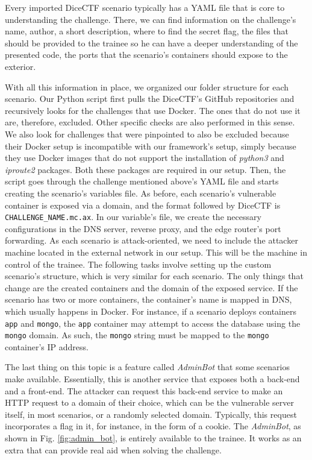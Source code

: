 Every imported DiceCTF scenario typically has a YAML file that is core to understanding the challenge. There, we can find information on the challenge's name, author, a short description, where to find the secret flag, the files that should be provided to the trainee so he can have a deeper understanding of the presented code, the ports that the scenario's containers should expose to the exterior.

With all this information in place, we organized our folder structure for each scenario. Our Python script first pulls the DiceCTF's GitHub repositories and recursively looks for the challenges that use Docker. The ones that do not use it are, therefore, excluded. Other specific checks are also performed in this sense. We also look for challenges that were pinpointed to also be excluded because their Docker setup is incompatible with our framework's setup, simply because they use Docker images that do not support the installation of \textit{python3} and \textit{iproute2} packages. Both these packages are required in our setup.
Then, the script goes through the challenge mentioned above's YAML file and starts creating the scenario's variables file. As before, each scenario's vulnerable container is exposed via a domain, and the format followed by DiceCTF is \texttt{{CHALLENGE\_NAME}.mc.ax}. In our variable's file, we create the necessary configurations in the DNS server, reverse proxy, and the edge router's port forwarding. As each scenario is attack-oriented, we need to include the attacker machine located in the external network in our setup. This will be the machine in control of the trainee. The following tasks involve setting up the custom scenario's structure, which is very similar for each scenario. The only things that change are the created containers and the domain of the exposed service. If the scenario has two or more containers, the container's name is mapped in DNS, which usually happens in Docker. For instance, if a scenario deploys containers \texttt{app} and \texttt{mongo}, the \texttt{app} container may attempt to access the database using the \texttt{mongo} domain. As such, the \texttt{mongo} string must be mapped to the \texttt{mongo} container's IP address.

The last thing on this topic is a feature called \textit{AdminBot} that some scenarios make available. Essentially, this is another service that exposes both a back-end and a front-end. The attacker can request this back-end service to make an HTTP request to a domain of their choice, which can be the vulnerable server itself, in most scenarios, or a randomly selected domain. Typically, this request incorporates a flag in it, for instance, in the form of a cookie. The \textit{AdminBot}, as shown in Fig. \ref{fig:admin_bot}, is entirely available to the trainee. It works as an extra that can provide real aid when solving the challenge.

